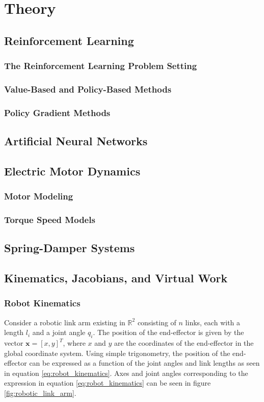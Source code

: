 \section{Theory}

\subsection{Reinforcement Learning}
    \subsubsection{The Reinforcement Learning Problem Setting}
    \subsubsection{Value-Based and Policy-Based Methods}
    \subsubsection{Policy Gradient Methods}

\subsection{Artificial Neural Networks}

\subsection{Electric Motor Dynamics}
    \subsubsection{Motor Modeling}
    \subsubsection{Torque Speed Models}

\subsection{Spring-Damper Systems}

\subsection{Kinematics, Jacobians, and Virtual Work}
    \subsubsection{Robot Kinematics}
    \label{sec:robot_kinematics}
Consider a robotic link arm existing in $\mathbb{R}^2$ consisting of $n$ links, each with a length $l_i$ and a joint angle $q_i$. The position of the end-effector is given by the vector $\mathbf{x} = [x, y]^T$, where $x$ and $y$ are the coordinates of the end-effector in the global coordinate system. Using simple trigonometry, the position of the end-effector can be expressed as a function of the joint angles and link lengths as seen in equation \ref{eq:robot_kinematics}. 
Axes and joint angles corresponding to the expression in equation \ref{eq:robot_kinematics} can be seen in figure \ref{fig:robotic_link_arm}. 

